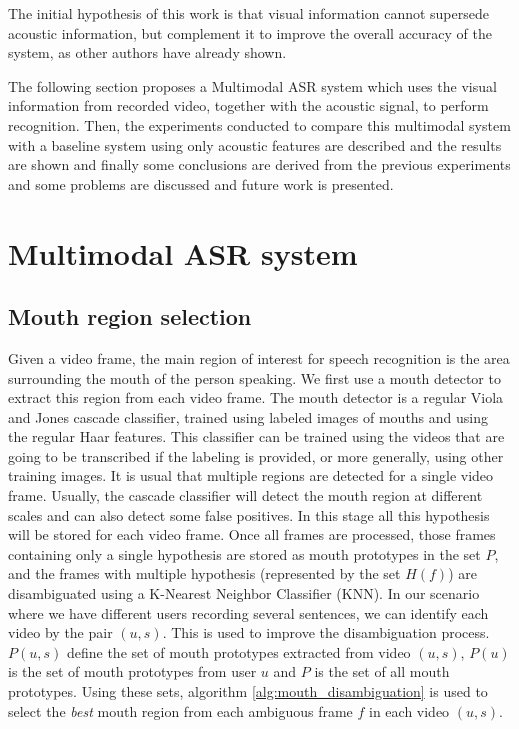 \documentclass[12pt,a4paper]{article}
\begin{document}
The initial hypothesis of this work is that visual information cannot supersede acoustic information, but complement it to improve the overall accuracy of the system, as other authors have already shown.

The following section proposes a Multimodal ASR system which uses the visual information from recorded video, together with the acoustic signal, to perform recognition. Then, the experiments conducted to compare this multimodal system with a baseline system using only acoustic features are described and the results are shown and finally some conclusions are derived from the previous experiments and some problems are discussed and future work is presented.

\section{Multimodal ASR system}
\subsection{Mouth region selection}
Given a video frame, the main region of interest for speech recognition is the area surrounding the mouth of the person speaking. We first use a mouth detector to extract this region from each video frame. The mouth detector is a regular Viola and Jones\cite{violarapid} cascade classifier, trained using labeled images of mouths and using the regular Haar features\cite{papageorgiou1998general}. This classifier can be trained using the videos that are going to be transcribed if the labeling is provided, or more generally, using other training images. It is usual that multiple regions are detected for a single video frame. Usually, the cascade classifier will detect the mouth region at different scales and can also detect some false positives. In this stage all this hypothesis will be stored for each video frame. Once all frames are processed, those frames containing only a single hypothesis are stored as mouth prototypes in the set $P$, and the frames with multiple hypothesis (represented by the set $H(f)$) are disambiguated using a K-Nearest Neighbor Classifier (KNN).
In our scenario where we have different users recording several sentences, we can identify each video by the pair $(u,s)$. This is used to improve the disambiguation process. $P(u,s)$ define the set of mouth prototypes extracted from video $(u,s)$, $P(u)$ is the set of mouth prototypes from user $u$ and $P$ is the set of all mouth prototypes. Using these sets, algorithm \ref{alg:mouth_disambiguation} is used to select the \emph{best} mouth region from each ambiguous frame $f$ in each video $(u,s)$.
\end{document}
